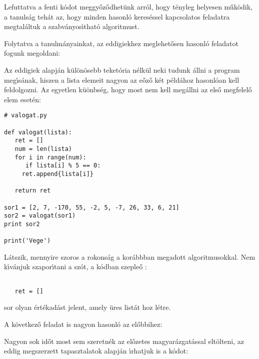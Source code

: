 \documentclass[12pt]{article}
\newcounter{feladat}
\newcounter{megold}
\begin{document}
Lefuttatva a fenti k\'odot meggy\H{o}z\H{o}dhet\"unk arr\'ol, hogy t\'enyleg helyesen m\H{u}k\"odik, a tanuls\'ag 
teh\'at az, hogy minden hasonl\'o keres\'essel kapcsolatos feladatra megtal\'altuk a szabv\'anyos\'{\i}that\'o 
algoritmust.

Folytatva a tanulm\'anyainkat, az eddigiekhez meglehet\H{o}sen hasonl\'o feladatot fogunk megoldani:



Az eddigiek alapj\'an k\"ul\"on\"osebb teket\'oria n\'elk\"ul neki tudunk \'allni a program meg\'{\i}s\'anak, hiszen 
a lista elemeit nagyon az e\H{o}z\H{o} k\'et p\'eld\'ahoz hasonl\'oan kell feldolgozni. Az egyetlen k\"u\"onbs\'eg, hogy most 
nem kell meg\'allni az els\H{o} megfelel\H{o} elem eset\'en:

\begin{Verbatim}[fontsize=\small]
# valogat.py

def valogat(lista):
   ret = []
   num = len(lista)
   for i in range(num):
      if lista[i] % 5 == 0:
	 ret.append{lista[i]}

   return ret

sor1 = [2, 7, -170, 55, -2, 5, -7, 26, 33, 6, 21]
sor2 = valogat(sor1)
print sor2

print('Vege')  
\end{Verbatim}

\noindent L\'atszik, mennyire szoros a rokons\'ag a kor\'abbban megadott algoritmusokkal. Nem k\'{\i}v\'anjuk 
szapor\'{\i}tani a sz\'ot, a k\'odban szeple\H{o} :

\begin{Verbatim}[fontsize=\small]

   ret = []

\end{Verbatim}

\noindent sor olyan \'ert\'ekad\'ast jelent, amely \"ures list\'at hoz l\'etre.

A k\"ovetkez\H{o} feladat is nagyon hasonl\'o 
az el\H{o}bbihez:


Nagyon sok id\H{o}t most sem szeretn\'ek az el\H{o}zetes magyar\'azgat\'assal elt\"olteni, az eddig megszerzett tapasztalatok 
alapj\'an \'{\i}rhatjuk is a k\'odot:
\end{document}
